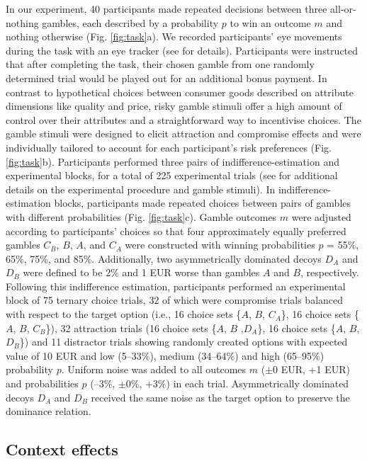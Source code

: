 \documentclass[11pt, a4paper]{article}
\begin{document}
In our experiment, 40 participants made repeated decisions between three all-or-nothing gambles, each described by a probability $p$ to win an outcome $m$ and nothing otherwise (Fig. \ref{fig:task}a). We recorded participants' eye movements during the task with an eye tracker (see  for details). Participants were instructed that after completing the task, their chosen gamble from one randomly determined trial would be played out for an additional bonus payment. In contrast to hypothetical choices between consumer goods described on attribute dimensions like quality and price, risky gamble stimuli offer a high amount of control over their attributes and a straightforward way to incentivise choices. The gamble stimuli were designed to elicit attraction and compromise effects and were individually tailored to account for each participant's risk preferences (Fig. \ref{fig:task}b). Participants performed three pairs of indifference-estimation and experimental blocks, for a total of 225 experimental trials (see  for additional details on the experimental procedure and gamble stimuli). In indifference-estimation blocks, participants made repeated choices between pairs of gambles with different probabilities (Fig. \ref{fig:task}c). Gamble outcomes $m$ were adjusted according to participants' choices so that four approximately equally preferred gambles $C_B$, $B$, $A$, and $C_A$ were constructed with winning probabilities $p$ = 55\%, 65\%, 75\%, and 85\%. Additionally, two asymmetrically dominated decoys $D_A$ and $D_B$ were defined to be 2\% and 1 EUR worse than gambles $A$ and $B$, respectively. Following this indifference estimation, participants performed an experimental block of 75 ternary choice trials, 32 of which were compromise trials balanced with respect to the target option (i.e., 16 choice sets \{$A$, $B$, $C_A$\}, 16 choice sets \{$A$, $B$, $C_B$\}), 32 attraction trials (16 choice sets \{$A$, $B$ ,$D_A$\}, 16 choice sets \{$A$, $B$, $D_B$\}) and 11 distractor trials showing randomly created options with expected value of 10 EUR and low (5–33\%), medium (34–64\%) and high (65–95\%) probability $p$. Uniform noise was added to all outcomes $m$ ($\pm$0 EUR, +1 EUR) and probabilities $p$ (–3\%, $\pm$0\%, +3\%) in each trial. Asymmetrically dominated decoys $D_A$ and $D_B$ received the same noise as the target option to preserve the dominance relation.

\subsection*{Context effects}
\end{document}
